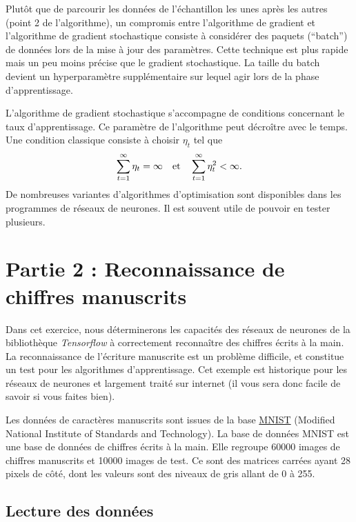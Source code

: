 \documentclass[]{article}
\begin{document}
Plutôt que de parcourir les données de l'échantillon les unes après les
autres (point 2 de l'algorithme), un compromis entre l'algorithme de
gradient et l'algorithme de gradient stochastique consiste à considérer
des paquets (``batch'') de données lors de la mise à jour des
paramètres. Cette technique est plus rapide mais un peu moins précise
que le gradient stochastique. La taille du batch devient un
hyperparamètre supplémentaire sur lequel agir lors de la phase
d'apprentissage.

L'algorithme de gradient stochastique s'accompagne de conditions
concernant le taux d'apprentissage. Ce paramètre de l'algorithme peut
décroître avec le temps. Une condition classique consiste à choisir
\(\eta_t\) tel que \[
\sum_{t=1}^\infty \eta_t = \infty \quad {\rm et } \quad \sum_{t=1}^\infty \eta_t^2 < \infty.
\] De nombreuses variantes d'algorithmes d'optimisation sont disponibles
dans les programmes de réseaux de neurones. Il est souvent utile de
pouvoir en tester plusieurs.

\section{Partie 2 : Reconnaissance de chiffres
manuscrits}\label{partie-2-reconnaissance-de-chiffres-manuscrits}

Dans cet exercice, nous déterminerons les capacités des réseaux de
neurones de la bibliothèque \emph{Tensorflow} à correctement reconnaître
des chiffres écrits à la main. La reconnaissance de l'écriture
manuscrite est un problème difficile, et constitue un test pour les
algorithmes d'apprentissage. Cet exemple est historique pour les réseaux
de neurones et largement traité sur internet (il vous sera donc facile
de savoir si vous faites bien).

Les données de caractères manuscrits sont issues de la base
\href{https://fr.wikipedia.org/wiki/Base_de_donn\%C3\%A9es_MNIST}{MNIST}
(Modified National Institute of Standards and Technology). La base de
données MNIST est une base de données de chiffres écrits à la main. Elle
regroupe 60000 images de chiffres manuscrits et 10000 images de test. Ce
sont des matrices carrées ayant 28 pixels de côté, dont les valeurs sont
des niveaux de gris allant de 0 à 255.

\subsection{Lecture des données}\label{lecture-des-donnees}
\end{document}
